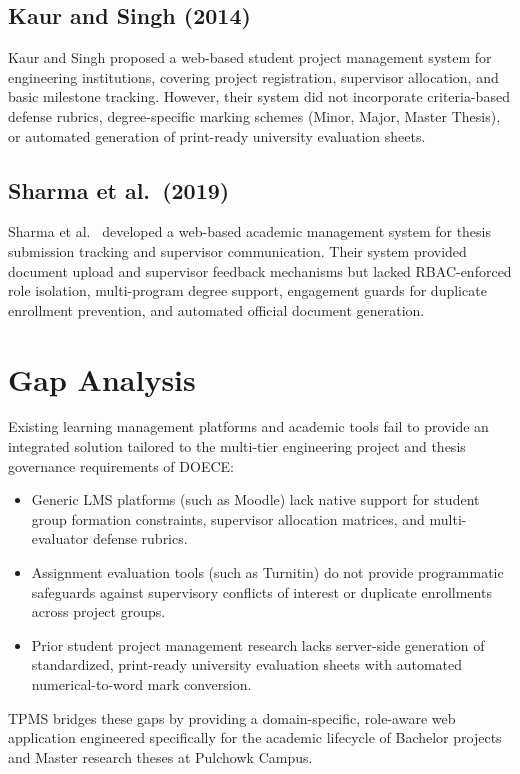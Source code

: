 \subsection{Kaur and Singh (2014)}
Kaur and Singh \cite{kaur2014design} proposed a web-based student project management system for engineering institutions, covering project registration, supervisor allocation, and basic milestone tracking. However, their system did not incorporate criteria-based defense rubrics, degree-specific marking schemes (Minor, Major, Master Thesis), or automated generation of print-ready university evaluation sheets.

\subsection{Sharma et al.\ (2019)}
Sharma et al.\ \cite{sharma2019web} developed a web-based academic management system for thesis submission tracking and supervisor communication. Their system provided document upload and supervisor feedback mechanisms but lacked RBAC-enforced role isolation, multi-program degree support, engagement guards for duplicate enrollment prevention, and automated official document generation.

\section{Gap Analysis}
Existing learning management platforms and academic tools fail to provide an integrated solution tailored to the multi-tier engineering project and thesis governance requirements of DOECE:

\begin{itemize}
  \item Generic LMS platforms (such as Moodle) lack native support for student group formation constraints, supervisor allocation matrices, and multi-evaluator defense rubrics.
  \item Assignment evaluation tools (such as Turnitin) do not provide programmatic safeguards against supervisory conflicts of interest or duplicate enrollments across project groups.
  \item Prior student project management research lacks server-side generation of standardized, print-ready university evaluation sheets with automated numerical-to-word mark conversion.
\end{itemize}

TPMS bridges these gaps by providing a domain-specific, role-aware web application engineered specifically for the academic lifecycle of Bachelor projects and Master research theses at Pulchowk Campus.

